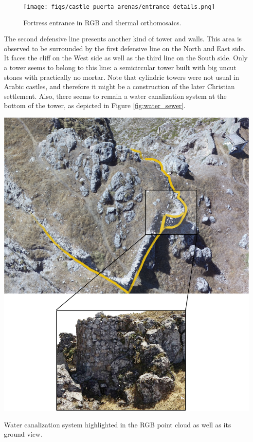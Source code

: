 \begin{figure}[htbp]
    \centering
    \texttt{[image: figs/castle\_puerta\_arenas/entrance\_details.png]}
    \caption{Fortress entrance in RGB and thermal orthomosaics.}
    \label{fig:entrance_details}
\end{figure}

The second defensive line presents another kind of tower and walls. This area is observed to be surrounded by the first defensive line on the North and East side. It faces the cliff on the West side as well as the third line on the South side. Only a tower seems to belong to this line: a semicircular tower built with big uncut stones with practically no mortar. Note that cylindric towers were not usual in Arabic castles, and therefore it might be a construction of the later Christian settlement. Also, there seems to remain a water canalization system at the bottom of the tower, as depicted in Figure \ref{fig:water_sewer}.

\begin{marginfigure}[.2cm]
    \centering
    \includegraphics[width=\linewidth]{figs/castle_puerta_arenas/water_canalization.png}
	\caption{Water canalization system highlighted in the RGB point cloud as well as its ground view.}
	\label{fig:water_sewer}
\end{marginfigure}


